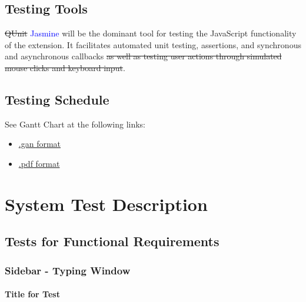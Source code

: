 \documentclass[12pt, titlepage]{article}
\begin{document}
\subsection{Testing Tools}

\sout{QUnit} \textcolor{blue}{Jasmine} will be the dominant tool for testing 
the JavaScript functionality of the 
extension. It facilitates automated unit testing, assertions, and synchronous 
and asynchronous callbacks \sout{ as well as testing user actions through 
simulated mouse clicks and keyboard input}.

\subsection{Testing Schedule}
		
See Gantt Chart at the following links:

\begin{itemize}
	\item 
	\href{https://gitlab.cas.mcmaster.ca/macsidenotes/macsidenotes/blob/master/ProjectSchedule/MacSidenotesProjectSchedule.gan}{.gan
	 format}
	\item 
	\href{https://gitlab.cas.mcmaster.ca/macsidenotes/macsidenotes/blob/master/ProjectSchedule/MacSidenotesProjectSchedule.pdf}{.pdf
	 format}
\end{itemize}


\section{System Test Description}
	
\subsection{Tests for Functional Requirements}

\subsubsection{Sidebar - Typing Window}
		
\paragraph{Title for Test}
\end{document}
